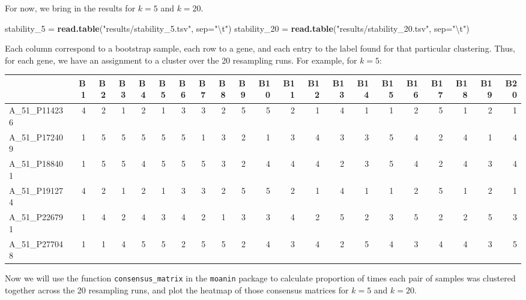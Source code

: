 \documentclass[9pt,a4paper,]{extarticle}
\newenvironment{Shaded}{\begin{snugshade}}{\end{snugshade}}
\newcommand{\CharTok}[1]{\textcolor[rgb]{0.31,0.60,0.02}{#1}}
\newcommand{\DataTypeTok}[1]{\textcolor[rgb]{0.13,0.29,0.53}{#1}}
\newcommand{\DecValTok}[1]{\textcolor[rgb]{0.00,0.00,0.81}{#1}}
\newcommand{\KeywordTok}[1]{\textcolor[rgb]{0.13,0.29,0.53}{\textbf{#1}}}
\newcommand{\NormalTok}[1]{#1}
\newcommand{\StringTok}[1]{\textcolor[rgb]{0.31,0.60,0.02}{#1}}
\begin{document}
For now, we bring in the results for \(k=5\) and \(k=20\).

\begin{Shaded}
\begin{Highlighting}[]
\NormalTok{stability_}\DecValTok{5}\NormalTok{ =}\StringTok{ }\KeywordTok{read.table}\NormalTok{(}\StringTok{"results/stability_5.tsv"}\NormalTok{, }\DataTypeTok{sep=}\StringTok{"}\CharTok{\textbackslash{}t}\StringTok{"}\NormalTok{)}
\NormalTok{stability_}\DecValTok{20}\NormalTok{ =}\StringTok{ }\KeywordTok{read.table}\NormalTok{(}\StringTok{"results/stability_20.tsv"}\NormalTok{, }\DataTypeTok{sep=}\StringTok{"}\CharTok{\textbackslash{}t}\StringTok{"}\NormalTok{)}
\end{Highlighting}
\end{Shaded}

Each column correspond to a bootstrap sample, each row to a gene, and each
entry to the label found for that particular clustering. Thus, for each gene,
we have an assignment to a cluster over the 20 resampling runs. For example,
for \(k=5\):

\begin{tabular}{l|r|r|r|r|r|r|r|r|r|r|r|r|r|r|r|r|r|r|r|r}
\hline
  & B1 & B2 & B3 & B4 & B5 & B6 & B7 & B8 & B9 & B10 & B11 & B12 & B13 & B14 & B15 & B16 & B17 & B18 & B19 & B20\\
\hline
A\_51\_P114236 & 4 & 2 & 1 & 2 & 1 & 3 & 3 & 2 & 5 & 5 & 2 & 1 & 4 & 1 & 1 & 2 & 5 & 1 & 2 & 1\\
\hline
A\_51\_P172409 & 1 & 5 & 5 & 5 & 5 & 5 & 1 & 3 & 2 & 1 & 3 & 4 & 3 & 3 & 5 & 4 & 2 & 4 & 1 & 4\\
\hline
A\_51\_P188401 & 1 & 5 & 5 & 4 & 5 & 5 & 5 & 3 & 2 & 4 & 4 & 4 & 2 & 3 & 5 & 4 & 2 & 4 & 3 & 4\\
\hline
A\_51\_P191274 & 4 & 2 & 1 & 2 & 1 & 3 & 3 & 2 & 5 & 5 & 2 & 1 & 4 & 1 & 1 & 2 & 5 & 1 & 2 & 1\\
\hline
A\_51\_P226791 & 1 & 4 & 2 & 4 & 3 & 4 & 2 & 1 & 3 & 3 & 4 & 2 & 5 & 2 & 3 & 5 & 2 & 2 & 5 & 3\\
\hline
A\_51\_P277048 & 1 & 1 & 4 & 5 & 5 & 2 & 5 & 5 & 2 & 4 & 3 & 4 & 2 & 5 & 4 & 3 & 4 & 4 & 3 & 5\\
\hline
\end{tabular}

Now we will use the function \texttt{consensus\_matrix} in the \texttt{moanin} package to
calculate proportion of times each pair of samples was clustered together
across the 20 resampling runs, and plot the heatmap of those consensus
matrices for \(k=5\) and \(k=20\).
\end{document}
